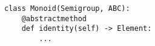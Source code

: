 \par\begin{minipage}{60ex}
\begin{verbatim}
class Monoid(Semigroup, ABC):
    @abstractmethod
    def identity(self) -> Element:
        ...
\end{verbatim}
\end{minipage}\par